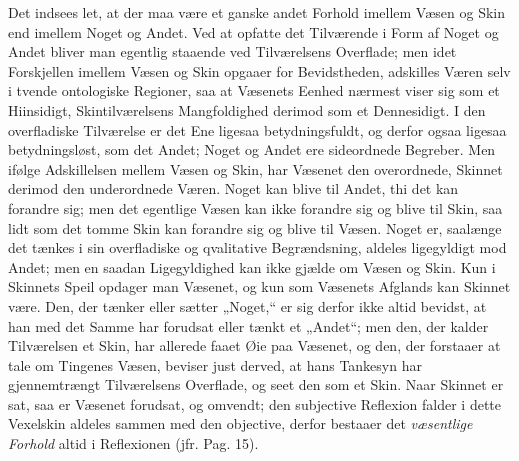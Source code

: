 \documentclass[12pt]{book}
\newcommand{\opage}[1]{\marginnote{\footnotesize\textit{[#1]}}}
\begin{document}
Det indsees let, at der maa være et ganske andet Forhold imellem Væsen og Skin end
imellem Noget og Andet. Ved at opfatte det Tilværende i Form af Noget og Andet
\opage{120} %
bliver man egentlig staaende ved Tilværelsens Overflade; men idet Forskjellen imellem
Væsen og Skin opgaaer for Bevidstheden, adskilles Væren selv i tvende ontologiske
Regioner, saa at Væsenets Eenhed nærmest viser sig som et Hiinsidigt,
Skintilværelsens Mangfoldighed derimod som et Dennesidigt. I den overfladiske
Tilværelse er det Ene ligesaa betydningsfuldt, og derfor ogsaa ligesaa
betydningsløst, som det Andet; Noget og Andet ere sideordnede Begreber. Men ifølge
Adskillelsen mellem Væsen og Skin, har Væsenet den overordnede, Skinnet derimod den
underordnede Væren. Noget kan blive til Andet, thi det kan forandre sig; men det
egentlige Væsen kan ikke forandre sig og blive til Skin, saa lidt som det tomme Skin
kan forandre sig og blive til Væsen. Noget er, saalænge det tænkes i sin overfladiske
og qvalitative Begrændsning, aldeles ligegyldigt mod Andet; men en saadan
Ligegyldighed kan ikke gjælde om Væsen og Skin. Kun i Skinnets Speil opdager man
Væsenet, og kun som Væsenets Afglands kan Skinnet være. Den, der tænker eller sætter
„Noget,“ er sig derfor ikke altid bevidst, at han med det Samme har forudsat eller
tænkt et „Andet“; men den, der kalder Tilværelsen et Skin, har allerede faaet Øie paa
Væsenet, og den, der forstaaer at tale om Tingenes Væsen, beviser just derved, at hans
Tankesyn har gjennemtrængt Tilværelsens Overflade, og seet den som et Skin. Naar
Skinnet er sat, saa er Væsenet forudsat, og omvendt; den subjective Reflexion falder i
dette Vexelskin aldeles sammen med den objective, derfor bestaaer det
\emph{væsentlige Forhold} altid i Reflexionen (jfr. Pag. 15).
\end{document}
